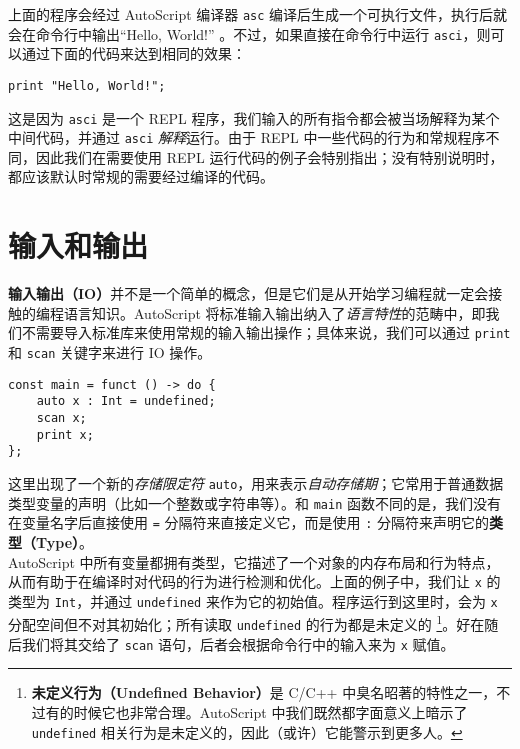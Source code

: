 上面的程序会经过 AutoScript 编译器 \lstinline!asc! 编译后生成一个可执行文件，执行后就会在命令行中输出“Hello, World!” 。不过，如果直接在命令行中运行 \lstinline!asci!，则可以通过下面的代码来达到相同的效果：

\begin{lstlisting}
print "Hello, World!";
\end{lstlisting}

这是因为 \lstinline!asci! 是一个 REPL 程序，我们输入的所有指令都会被当场解释为某个中间代码，并通过 \lstinline!asci! \emph{解释}运行。由于 REPL 中一些代码的行为和常规程序不同，因此我们在需要使用 REPL 运行代码的例子会特别指出；没有特别说明时，都应该默认时常规的需要经过编译的代码。


\section{输入和输出}

\textbf{输入输出（IO）}并不是一个简单的概念，但是它们是从开始学习编程就一定会接触的编程语言知识。AutoScript 将标准输入输出纳入了\emph{语言特性}的范畴中，即我们不需要导入标准库来使用常规的输入输出操作；具体来说，我们可以通过 \lstinline!print! 和 \lstinline!scan! 关键字来进行 IO 操作。

\begin{lstlisting}
const main = funct () -> do {
    auto x : Int = undefined;
    scan x;
    print x;
};
\end{lstlisting}

这里出现了一个新的\emph{存储限定符} \lstinline!auto!，用来表示\emph{自动存储期}；它常用于普通数据类型变量的声明（比如一个整数或字符串等）。和 \lstinline!main! 函数不同的是，我们没有在变量名字后直接使用 \lstinline!=! 分隔符来直接定义它，而是使用 \lstinline!:! 分隔符来声明它的\textbf{类型（Type）}。 \\

AutoScript 中所有变量都拥有类型，它描述了一个对象的内存布局和行为特点，从而有助于在编译时对代码的行为进行检测和优化。上面的例子中，我们让 \lstinline!x! 的类型为 \lstinline!Int!，并通过 \lstinline!undefined! 来作为它的初始值。程序运行到这里时，会为 \lstinline!x! 分配空间但不对其初始化；所有读取 \lstinline!undefined! 的行为都是未定义的 \footnote{\textbf{未定义行为（Undefined Behavior）}是 C/C++ 中臭名昭著的特性之一，不过有的时候它也非常合理。AutoScript 中我们既然都字面意义上暗示了 \lstinline!undefined! 相关行为是未定义的，因此（或许）它能警示到更多人。}。好在随后我们将其交给了 \lstinline!scan! 语句，后者会根据命令行中的输入来为 \lstinline!x! 赋值。 \\

